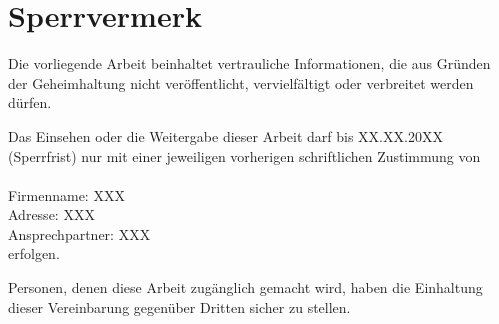 \newpage
\thispagestyle{empty}
\section*{Sperrvermerk}

Die vorliegende Arbeit beinhaltet vertrauliche Informationen, die aus Gründen der Geheimhaltung
nicht veröffentlicht, vervielfältigt oder verbreitet werden dürfen.

Das Einsehen oder die Weitergabe dieser Arbeit darf bis XX.XX.20XX (Sperrfrist) nur mit einer jeweiligen vorherigen schriftlichen Zustimmung von 
\\\\
\noindent
Firmenname: XXX \\
Adresse: XXX\\
Ansprechpartner: XXX\\

\noindent
erfolgen.

Personen, denen diese Arbeit zugänglich gemacht wird, haben die Einhaltung dieser Vereinbarung gegenüber Dritten sicher zu stellen.

